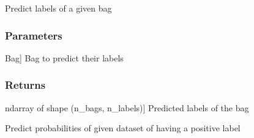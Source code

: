 \documentclass[letterpaper,10pt,english]{sphinxmanual}
\begin{document}
\begin{fulllineitems}
\begin{fulllineitems}
\label{\detokenize{classifier/_autosummary/miml.classifier.miml_classifier.MIMLClassifier:miml.classifier.miml_classifier.MIMLClassifier.predict_bag}}
\pysigstartsignatures
{}
\pysigstopsignatures
\sphinxAtStartPar
Predict labels of a given bag


\subsubsection{Parameters}
\label{\detokenize{classifier/_autosummary/miml.classifier.miml_classifier.MIMLClassifier:id4}}\begin{description}
\sphinxlineitem{bag}{[}Bag{]}
\sphinxAtStartPar
Bag to predict their labels

\end{description}


\subsubsection{Returns}
\label{\detokenize{classifier/_autosummary/miml.classifier.miml_classifier.MIMLClassifier:id5}}\begin{description}
\sphinxlineitem{results}{[}ndarray of shape (n\_bags, n\_labels){]}
\sphinxAtStartPar
Predicted labels of the bag

\end{description}

\end{fulllineitems}


\begin{fulllineitems}
\label{\detokenize{classifier/_autosummary/miml.classifier.miml_classifier.MIMLClassifier:miml.classifier.miml_classifier.MIMLClassifier.predict_proba}}
\pysigstartsignatures
{}
\pysigstopsignatures
\sphinxAtStartPar
Predict probabilities of given dataset of having a positive label



\end{fulllineitems}
\end{fulllineitems}
\end{document}
